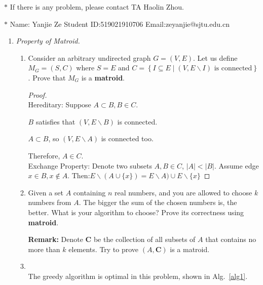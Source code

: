 \documentclass[12pt,a4paper]{article}
\makeatletter
\newtheorem*{solution}{Solution}
\theoremstyle{definition}
\renewenvironment{solution}[1][Solution] {\par\pushQED{\qed}\normalfont\topsep6\p@\@plus6\p@\relax\trivlist\item[\hskip\labelsep\bfseries#1\@addpunct{.}]\ignorespaces}{\popQED\endtrivlist\@endpefalse} \makeatother
\makeatother
\begin{document}
\noindent

\noindent{}
\begin{center}
\footnotesize{\color{red}$*$ If there is any problem, please contact TA Haolin Zhou.}

\footnotesize{\color{blue}$*$ Name: Yanjie Ze  \quad Student ID:519021910706 \quad Email:zeyanjie@sjtu.edu.cn}
\end{center}
\begin{enumerate}
\item \textit{Property of Matroid.} 
\begin{enumerate}
	\item
	Consider an arbitrary undirected graph $ G=(V,E) $. Let us define $ M_{G}=(S,C) $ where $ S=E $ and $ C=\left\{I \subseteq E \mid\left(V, E \backslash I\right) \text { is connected}\right\} $. Prove that $ M_{G} $ is a \textbf{matroid}.\par
	    \begin{proof}
	    ~\\
{\color{blue}Hereditary}: Suppose $A\subset B, B\in C$.

$B$ satisfies that $(V, E\backslash B)$ is connected.

$A\subset B$, so $(V, E\backslash A)$ is connected too.

Therefore, $A\in C$.
~\\

{\color{blue}Exchange Property}: Denote two subsets $A, B\in C$, $|A| < |B|$. Assume edge $x\in B, x\notin A$. Then:$E\backslash (A\cup \{x\}) = E\backslash A) \cup E\backslash \{x\}$

	   \end{proof}
	\item
	Given a set $A$ containing $n$ real numbers, and you are allowed to choose $k$ numbers from $A$. The bigger the sum of the chosen numbers is, the better. What is your algorithm to choose? Prove its correctness using \textbf{matroid}.\par
	\textbf{Remark:} Denote $\mathbf{C}$ be the collection of all subsets of $A$ that contains no more than $k$ elements. Try to prove $(A,\mathbf{C})$ is a matroid.\par
	   \begin{solution}
	   ~\\
	   The greedy algorithm is optimal in this problem, shown in Alg.~\ref{alg1}.
	   

\end{solution}
\end{enumerate}
\end{enumerate}
\end{document}
